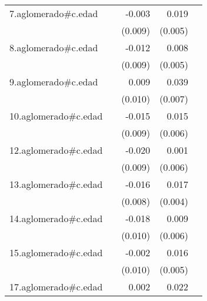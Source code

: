 {\begin{longtable}{l*{4}{D{.}{.}{-1}}}
\addlinespace
7.aglomerado#c.edad&                     &      -0.003         &       0.019\sym{***}&                     \\
            &                     &     (0.009)         &     (0.005)         &                     \\
\addlinespace
8.aglomerado#c.edad&                     &      -0.012         &       0.008         &                     \\
            &                     &     (0.009)         &     (0.005)         &                     \\
\addlinespace
9.aglomerado#c.edad&                     &       0.009         &       0.039\sym{***}&                     \\
            &                     &     (0.010)         &     (0.007)         &                     \\
\addlinespace
10.aglomerado#c.edad&                     &      -0.015         &       0.015\sym{*}  &                     \\
            &                     &     (0.009)         &     (0.006)         &                     \\
\addlinespace
12.aglomerado#c.edad&                     &      -0.020\sym{*}  &       0.001         &                     \\
            &                     &     (0.009)         &     (0.006)         &                     \\
\addlinespace
13.aglomerado#c.edad&                     &      -0.016\sym{*}  &       0.017\sym{***}&                     \\
            &                     &     (0.008)         &     (0.004)         &                     \\
\addlinespace
14.aglomerado#c.edad&                     &      -0.018         &       0.009         &                     \\
            &                     &     (0.010)         &     (0.006)         &                     \\
\addlinespace
15.aglomerado#c.edad&                     &      -0.002         &       0.016\sym{**} &                     \\
            &                     &     (0.010)         &     (0.005)         &                     \\
\addlinespace
17.aglomerado#c.edad&                     &       0.002         &       0.022\sym{**} &                     \\

\end{longtable}}
